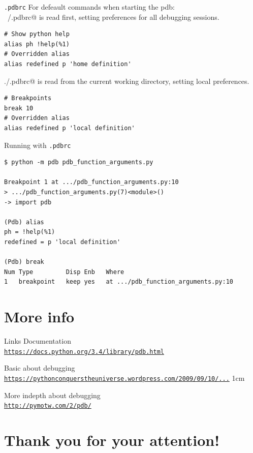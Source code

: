 \documentclass[
    size=20pt,
    style=sailor,
    display=slides,
    paper=smartboard,
    orient=landscape,
]{powerdot}
\begin{document}
\begin{slide}[method=file]{\texttt{.pdbrc}}
For defeault commands when starting the pdb:\\

\verb@~/.pdbrc@ is read first, setting preferences for all debugging 
sessions.
\begin{verbatim}
# Show python help
alias ph !help(%1)
# Overridden alias
alias redefined p 'home definition'
\end{verbatim}

\verb@./.pdbrc@ is read from the current working directory, setting 
local preferences.

\begin{verbatim}
# Breakpoints
break 10
# Overridden alias
alias redefined p 'local definition'
\end{verbatim}
\end{slide}


\begin{slide}[method=file]{Running with \texttt{.pdbrc}}
\begin{verbatim}
$ python -m pdb pdb_function_arguments.py

Breakpoint 1 at .../pdb_function_arguments.py:10
> .../pdb_function_arguments.py(7)<module>()
-> import pdb

(Pdb) alias
ph = !help(%1)
redefined = p 'local definition'

(Pdb) break
Num Type         Disp Enb   Where
1   breakpoint   keep yes   at .../pdb_function_arguments.py:10
\end{verbatim}
\end{slide}


\section{More info}



\begin{slide}[method=file]{Links}
Documentation\\
\href{https://docs.python.org/3.4/library/pdb.html}{
\texttt{https://docs.python.org/3.4/library/pdb.html}}
\vspace{1cm}


Basic about debugging\\
\href{
https://pythonconquerstheuniverse.wordpress.com/2009/09/10/debugging-in-python/}
{\texttt{https://pythonconquerstheuniverse.wordpress.com/2009/09/10/...}}\vspace
{ 1cm}


More indepth about debugging\\
\href{http://pymotw.com/2/pdb/}{\texttt{http://pymotw.com/2/pdb/}}
\end{slide}



\section[template=wideslide,tocsection=hidden]{Thank you for your attention!}
\end{document}
